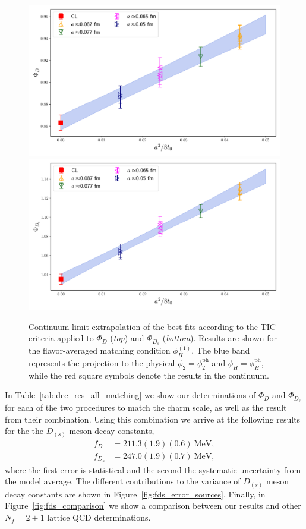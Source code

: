 \begin{figure}
	\centering
	\includegraphics[scale=0.23]{./cap6/figs/fds/fit_cl_fD_fl_ave.pdf}
	\includegraphics[scale=0.23]{./cap6/figs/fds/fit_cl_fDs_fl_ave.pdf}
	\caption{Continuum limit extrapolation of the best fits according to the TIC criteria applied to  $\Phi_D$ (\textit{top}) and $\Phi_{D_s}$ (\textit{bottom}).  Results are shown for the flavor-averaged matching condition $\phi_H^{(1)}$. The blue band represents the projection to the physical $\phi_2 = \phi_2^{\mathrm{ph}}$ and $\phi_H = \phi_H^{\mathrm{ph}}$, while the red square symbols denote the results in the continuum.}
	\label{fig:continuum_fits_fds}
\end{figure}

In Table~\ref{tab:dec_res_all_matching} we show our determinations of $\Phi_D$
and $\Phi_{D_s}$ for each of the two procedures to match the charm scale, as well
as the result from their combination. Using this combination we arrive at the following results for the the $D_{(s)}$ meson decay constants,
\begin{align}
	f_D &= 211.3(1.9)(0.6) \ \mathrm{MeV},
	\\
	f_{D_s} &= 247.0(1.9)(0.7) \ \mathrm{MeV},
\end{align}
where the first error is statistical and the second the systematic uncertainty from the model average. The different contributions to the variance of $D_{(s)}$ meson decay constants are 
shown in Figure~\ref{fig:fds_error_sources}. Finally, in  Figure~\ref{fig:fds_comparison} we show a comparison between our results and other $N_f=2+1$ lattice QCD determinations.
%


